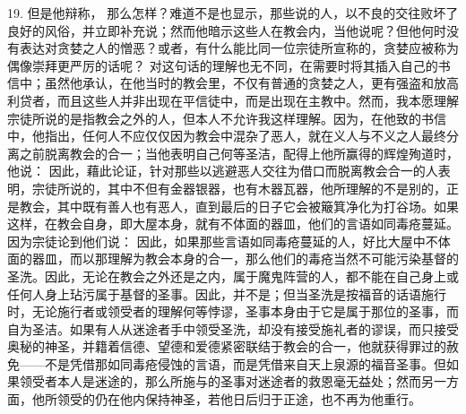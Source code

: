 19. 但是他辩称， 那么怎样？难道不是也显示，那些说的人，以不良的交往败坏了良好的风俗，并立即补充说；然而他暗示这些人在教会内，当他说呢？但他何时没有表达对贪婪之人的憎恶？或者，有什么能比同一位宗徒所宣称的，贪婪应被称为偶像崇拜更严厉的话呢？ 对这句话的理解也无不同，在需要时将其插入自己的书信中；虽然他承认，在他当时的教会里，不仅有普通的贪婪之人，更有强盗和放高利贷者，而且这些人并非出现在平信徒中，而是出现在主教中。然而，我本愿理解宗徒所说的是指教会之外的人，但本人不允许我这样理解。因为，在他致的书信中，他指出，任何人不应仅仅因为教会中混杂了恶人，就在义人与不义之人最终分离之前脱离教会的合一；当他表明自己何等圣洁，配得上他所赢得的辉煌殉道时，他说： 因此，藉此论证，针对那些以逃避恶人交往为借口而脱离教会合一的人表明，宗徒所说的，其中不但有金器银器，也有木器瓦器，他所理解的不是别的，正是教会，其中既有善人也有恶人，直到最后的日子它会被簸箕净化为打谷场。如果这样，在教会自身，即大屋本身，就有不体面的器皿，他们的言语如同毒疮蔓延。因为宗徒论到他们说：  因此，如果那些言语如同毒疮蔓延的人，好比大屋中不体面的器皿，而以那理解为教会本身的合一，那么他们的毒疮当然不可能污染基督的圣洗。因此，无论在教会之外还是之内，属于魔鬼阵营的人，都不能在自己身上或任何人身上玷污属于基督的圣事。因此，并不是；但当圣洗是按福音的话语施行时，无论施行者或领受者的理解何等悖谬，圣事本身由于它是属于那位的圣事，而自为圣洁。如果有人从迷途者手中领受圣洗，却没有接受施礼者的谬误，而只接受奥秘的神圣，并籍着信德、望德和爱德紧密联结于教会的合一，他就获得罪过的赦免——不是凭借那如同毒疮侵蚀的言语，而是凭借来自天上泉源的福音圣事。但如果领受者本人是迷途的，那么所施与的圣事对迷途者的救恩毫无益处；然而另一方面，他所领受的仍在他内保持神圣，若他日后归于正途，也不再为他重行。\par

